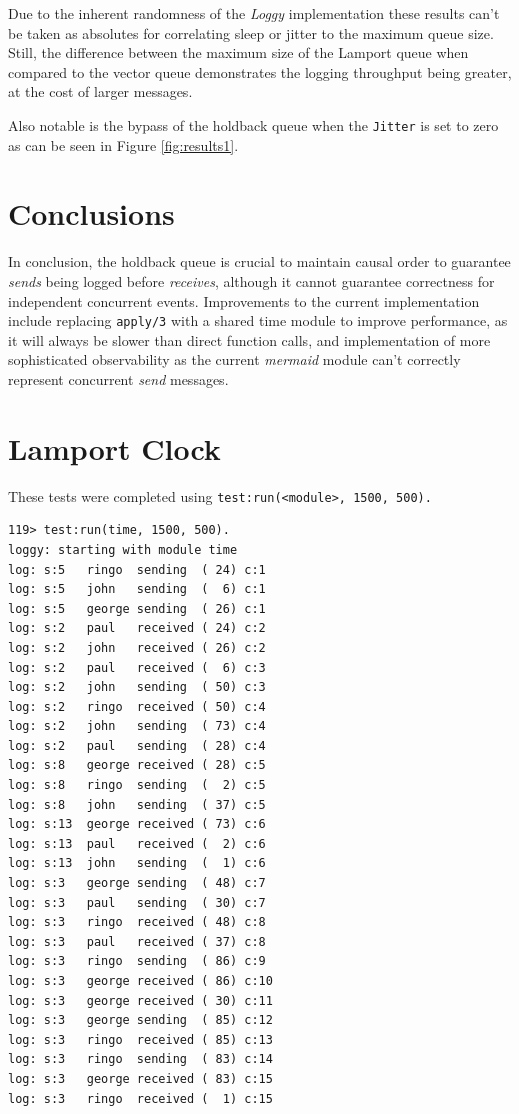 \documentclass[a4paper, 11pt]{article}
\begin{document}
Due to the inherent randomness of the \textit{Loggy} implementation these results can't be taken as absolutes for correlating sleep or jitter to the maximum queue size.
Still, the difference between the maximum size of the Lamport queue when compared to the vector queue demonstrates the logging throughput being greater, at the cost of larger messages.

Also notable is the bypass of the holdback queue when the \texttt{Jitter} is set to zero as can be seen in Figure \ref{fig:results1}.

\section{Conclusions}

In conclusion, the holdback queue is crucial to maintain causal order to guarantee \textit{sends} being logged before \textit{receives}, although it cannot guarantee correctness for independent concurrent events. 
Improvements to the current implementation include replacing \texttt{apply/3} with a shared time module to improve performance, as it will always be slower than direct function calls, and implementation of more sophisticated observability as the current \textit{mermaid} module can't correctly represent concurrent \textit{send} messages.

\newpage

\appendix

\section{Lamport Clock}
These tests were completed using \texttt{test:run(<module>, 1500, 500).}

\begin{verbatim}
119> test:run(time, 1500, 500).
loggy: starting with module time
log: s:5   ringo  sending  ( 24) c:1
log: s:5   john   sending  (  6) c:1
log: s:5   george sending  ( 26) c:1
log: s:2   paul   received ( 24) c:2
log: s:2   john   received ( 26) c:2
log: s:2   paul   received (  6) c:3
log: s:2   john   sending  ( 50) c:3
log: s:2   ringo  received ( 50) c:4
log: s:2   john   sending  ( 73) c:4
log: s:2   paul   sending  ( 28) c:4
log: s:8   george received ( 28) c:5
log: s:8   ringo  sending  (  2) c:5
log: s:8   john   sending  ( 37) c:5
log: s:13  george received ( 73) c:6
log: s:13  paul   received (  2) c:6
log: s:13  john   sending  (  1) c:6
log: s:3   george sending  ( 48) c:7
log: s:3   paul   sending  ( 30) c:7
log: s:3   ringo  received ( 48) c:8
log: s:3   paul   received ( 37) c:8
log: s:3   ringo  sending  ( 86) c:9
log: s:3   george received ( 86) c:10
log: s:3   george received ( 30) c:11
log: s:3   george sending  ( 85) c:12
log: s:3   ringo  received ( 85) c:13
log: s:3   ringo  sending  ( 83) c:14
log: s:3   george received ( 83) c:15
log: s:3   ringo  received (  1) c:15
\end{verbatim}
\end{document}
